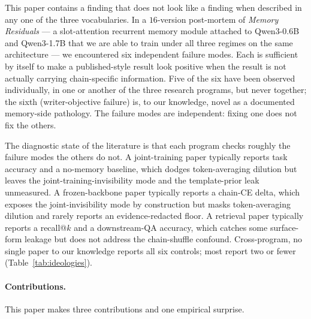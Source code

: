 \documentclass{article}
\begin{document}
This paper contains a finding that does not look like a finding when
described in any one of the three vocabularies.  In a $16$-version
post-mortem of \emph{Memory Residuals} --- a slot-attention recurrent
memory module attached to Qwen3-0.6B and Qwen3-1.7B that we are able
to train under all three regimes on the same architecture --- we
encountered six independent failure modes.  Each is sufficient by
itself to make a published-style result look positive when the result
is not actually carrying chain-specific information.  Five of the six
have been observed individually, in one or another of the three
research programs, but never together; the sixth (writer-objective
failure) is, to our knowledge, novel as a documented memory-side
pathology.  The failure modes are independent: fixing one does not
fix the others.

The diagnostic state of the literature is that each program checks
roughly the failure modes the others do not.  A joint-training paper
typically reports task accuracy and a no-memory baseline, which dodges
token-averaging dilution but leaves the joint-training-invisibility
mode and the template-prior leak unmeasured.  A frozen-backbone paper
typically reports a chain-CE delta, which exposes the
joint-invisibility mode by construction but masks token-averaging
dilution and rarely reports an evidence-redacted floor.  A retrieval
paper typically reports a recall@$k$ and a downstream-QA accuracy,
which catches some surface-form leakage but does not address the
chain-shuffle confound.  Cross-program, no single paper to our
knowledge reports all six controls; most report two or fewer
(Table~\ref{tab:ideologies}).

\paragraph{Contributions.}  This paper makes three contributions and
one empirical surprise.
\end{document}
